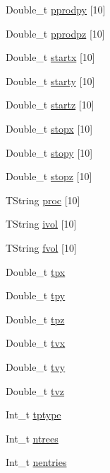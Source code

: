 \begin{DoxyCompactItemize}
Double\-\_\-t \hyperlink{classnu__g4numi_a7fa5412e9c5006b884f09226ae2c350a}{pprodpy} \mbox{[}10\mbox{]}
\item 
Double\-\_\-t \hyperlink{classnu__g4numi_a0bd7772ccdfe00660ce45d94c107a240}{pprodpz} \mbox{[}10\mbox{]}
\item 
Double\-\_\-t \hyperlink{classnu__g4numi_ab9ea407b9c38c0c73b606d9f6f4df80a}{startx} \mbox{[}10\mbox{]}
\item 
Double\-\_\-t \hyperlink{classnu__g4numi_a58d39dbb466f353155aca6a6e7a2cc12}{starty} \mbox{[}10\mbox{]}
\item 
Double\-\_\-t \hyperlink{classnu__g4numi_afc1991c5be450f31577f4e1d31dceb2f}{startz} \mbox{[}10\mbox{]}
\item 
Double\-\_\-t \hyperlink{classnu__g4numi_a3a3be4d4530073e364c2681eedf1c549}{stopx} \mbox{[}10\mbox{]}
\item 
Double\-\_\-t \hyperlink{classnu__g4numi_a04c56aedc6b4d97052a8a827131bf5ba}{stopy} \mbox{[}10\mbox{]}
\item 
Double\-\_\-t \hyperlink{classnu__g4numi_ab4cc476c30fea6d69043531da7e6c969}{stopz} \mbox{[}10\mbox{]}
\item 
T\-String \hyperlink{classnu__g4numi_a6583de2ce34a5d19409c09cc0b63692f}{proc} \mbox{[}10\mbox{]}
\item 
T\-String \hyperlink{classnu__g4numi_a956cc4ca8c07b803d8b0848101e10742}{ivol} \mbox{[}10\mbox{]}
\item 
T\-String \hyperlink{classnu__g4numi_a72d170869c1eb191d10366d07024417c}{fvol} \mbox{[}10\mbox{]}
\item 
Double\-\_\-t \hyperlink{classnu__g4numi_a8693b10daf61759ad2decb2c3aac6a9e}{tpx}
\item 
Double\-\_\-t \hyperlink{classnu__g4numi_a533f9a7e3002a702856c25dd1e5c7058}{tpy}
\item 
Double\-\_\-t \hyperlink{classnu__g4numi_a63eb35fe1697f426543e34652202e30b}{tpz}
\item 
Double\-\_\-t \hyperlink{classnu__g4numi_a8675345bdaaec6f0d4ff5f57571133a0}{tvx}
\item 
Double\-\_\-t \hyperlink{classnu__g4numi_ac81b906ee11d4c5e74a1b80378cae373}{tvy}
\item 
Double\-\_\-t \hyperlink{classnu__g4numi_adef9f7bf0e713b329e9af89ae32183ab}{tvz}
\item 
Int\-\_\-t \hyperlink{classnu__g4numi_a1047ac371479cee32c28f56adf885515}{tptype}
\item 
Int\-\_\-t \hyperlink{classnu__g4numi_a7f79de08a1e588073904b69a1b10d35b}{ntrees}
\item 
Int\-\_\-t \hyperlink{classnu__g4numi_a49582e60898463be66b4216b5bbda6eb}{nentries}
\end{DoxyCompactItemize}
